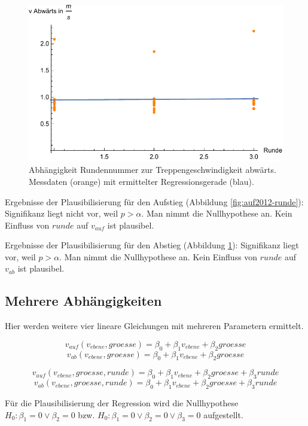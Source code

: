 \begin{figure} \centering 
	\includegraphics[]{abbildungen/regression/2012/ab-runde.pdf}
	
	\caption{Abhängigkeit Rundennummer zur Treppengeschwindigkeit abwärts. Messdaten (orange) mit ermittelter Regressionsgerade (blau). \label{fig:ab2012-runde}}
\end{figure}

Ergebnisse der Plausibilisierung für den Aufstieg
(Abbildung \ref{fig:auf2012-runde}):
Signifikanz liegt nicht vor, weil $p > \alpha$. Man nimmt die
Nullhypothese an. Kein Einfluss von $runde$ auf $v_{auf}$ ist plausibel.

Ergebnisse der Plausibilisierung für den Abstieg
(Abbildung \ref{fig:ab2012-runde}):
Signifikanz liegt vor, weil $p > \alpha$. Man nimmt die
Nullhypothese an. Kein Einfluss von $runde$ auf $v_{ab}$ ist plausibel.

\subsection{Mehrere Abhängigkeiten}

Hier werden weitere vier lineare Gleichungen mit mehreren Parametern ermittelt.

\[v_{auf}(v_{ebene}, groesse) = \beta_0 + \beta_1 v_{ebene} + \beta_2 groesse\]
\[v_{ab}(v_{ebene}, groesse) = \beta_0 + \beta_1 v_{ebene} + \beta_2 groesse\]

\[v_{auf}(v_{ebene}, groesse, runde) = \beta_0 + \beta_1 v_{ebene} + \beta_2 groesse + \beta_3 runde\]
\[v_{ab}(v_{ebene}, groesse, runde) = \beta_0 + \beta_1 v_{ebene} + \beta_2 groesse + \beta_3 runde\]

Für die Plausibilisierung der Regression wird die Nullhypothese 
$H_0: \beta_1 = 0  \lor \beta_2 = 0$ bzw. $H_0: \beta_1 = 0  \lor \beta_2 = 0 \lor \beta_3 = 0$ aufgestellt.

